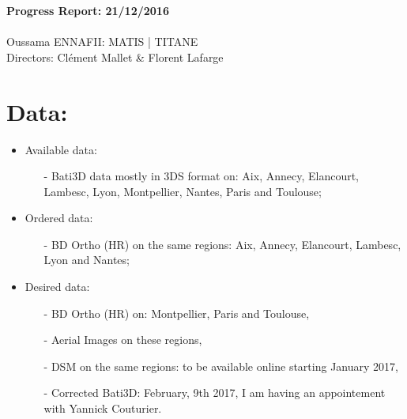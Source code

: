 \documentclass[a4paper, 11pt]{article}
\begin{document}
	\begin{centering}
		\large\textbf{Progress Report: 21/12/2016}\\
		~\\
		Oussama ENNAFII:
		\normalsize MATIS | TITANE \\
		Directors: Cl\'ement Mallet \& Florent Lafarge \\
	\end{centering}


	\section*{Data:}
	
	\begin{itemize}
		\item Available data:
			\begin{itemize}
				\item[-] Bati3D data mostly in 3DS format on: Aix, Annecy, Elancourt, Lambesc, Lyon, Montpellier, Nantes, Paris and Toulouse;
			\end{itemize}
		\item Ordered data:
			\begin{itemize}
				\item[-] BD Ortho (HR) on the same regions: Aix, Annecy, Elancourt, Lambesc, Lyon and Nantes;
			\end{itemize}
		\item Desired data:
			\begin{itemize}
				\item[-] BD Ortho (HR) on: Montpellier, Paris and Toulouse,
				\item[-] Aerial Images on these regions,
				\item[-] DSM on the same regions: to be available online starting January 2017,
				\item[-] Corrected Bati3D: February, 9th 2017, I am having an appointement with Yannick Couturier.
			\end{itemize}
	\end{itemize}
	
\end{document}

